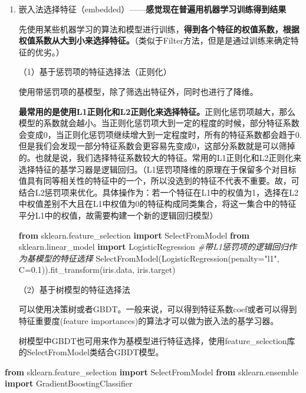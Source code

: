 \documentclass[
]{article}
\newenvironment{Shaded}{}{}
\newcommand{\CommentTok}[1]{\textcolor[rgb]{0.38,0.63,0.69}{\textit{#1}}}
\newcommand{\FloatTok}[1]{\textcolor[rgb]{0.25,0.63,0.44}{#1}}
\newcommand{\ImportTok}[1]{\textcolor[rgb]{0.00,0.50,0.00}{\textbf{#1}}}
\newcommand{\NormalTok}[1]{#1}
\newcommand{\OperatorTok}[1]{\textcolor[rgb]{0.40,0.40,0.40}{#1}}
\newcommand{\StringTok}[1]{\textcolor[rgb]{0.25,0.44,0.63}{#1}}
\begin{document}
\begin{enumerate}
\def\labelenumi{\arabic{enumi}.}
\item
  嵌入法选择特征（embedded）------\textbf{感觉现在普遍用机器学习训练得到结果}

  先使用某些机器学习的算法和模型进行训练，\textbf{得到各个特征的权值系数，根据权值系数从大到小来选择特征。}（类似于Filter方法，但是是通过训练来确定特征的优劣。）

  （1）基于惩罚项的特征选择法（正则化）

  使用带惩罚项的基模型，除了筛选出特征外，同时也进行了降维。

  \textbf{最常用的是使用L1正则化和L2正则化来选择特征。}正则化惩罚项越大，那么模型的系数就会越小。当正则化惩罚项大到一定的程度的时候，部分特征系数会变成0，当正则化惩罚项继续增大到一定程度时，所有的特征系数都会趋于0.
  但是我们会发现一部分特征系数会更容易先变成0，这部分系数就是可以筛掉的。也就是说，我们选择特征系数较大的特征。常用的L1正则化和L2正则化来选择特征的基学习器是逻辑回归。（L1惩罚项降维的原理在于保留多个对目标值具有同等相关性的特征中的一个，所以没选到的特征不代表不重要。故，可结合L2惩罚项来优化。具体操作为：若一个特征在L1中的权值为1，选择在L2中权值差别不大且在L1中权值为0的特征构成同类集合，将这一集合中的特征平分L1中的权值，故需要构建一个新的逻辑回归模型）

\begin{Shaded}
\begin{Highlighting}[]
\ImportTok{from}\NormalTok{ sklearn.feature\_selection }\ImportTok{import}\NormalTok{ SelectFromModel}
\ImportTok{from}\NormalTok{ sklearn.linear\_model }\ImportTok{import}\NormalTok{ LogisticRegression}
\CommentTok{\#带L1惩罚项的逻辑回归作为基模型的特征选择}
\NormalTok{SelectFromModel(LogisticRegression(penalty}\OperatorTok{=}\StringTok{"l1"}\NormalTok{, C}\OperatorTok{=}\FloatTok{0.1}\NormalTok{)).fit\_transform(iris.data, iris.target)}
\end{Highlighting}
\end{Shaded}

  （2）基于树模型的特征选择法

  可以使用决策树或者GBDT。一般来说，可以得到特征系数coef或者可以得到特征重要度(feature
  importances)的算法才可以做为嵌入法的基学习器。

  树模型中GBDT也可用来作为基模型进行特征选择，使用feature\_selection库的SelectFromModel类结合GBDT模型。
\end{enumerate}

\begin{Shaded}
\begin{Highlighting}[]
\ImportTok{from}\NormalTok{ sklearn.feature\_selection }\ImportTok{import}\NormalTok{ SelectFromModel}
\ImportTok{from}\NormalTok{ sklearn.ensemble }\ImportTok{import}\NormalTok{ GradientBoostingClassifier}
\end{Highlighting}
\end{Shaded}
\end{document}
